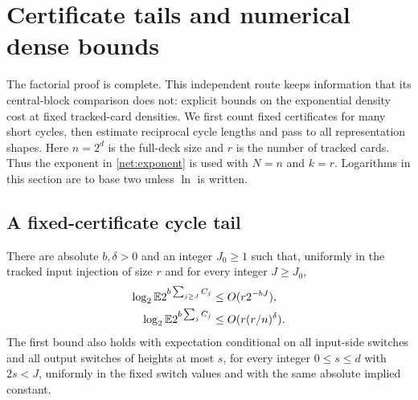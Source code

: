 \section{Certificate tails and numerical dense bounds}\label{sec:certificate}
The factorial proof is complete. This independent route keeps information that its central-block comparison does not: explicit bounds on the exponential density cost at fixed tracked-card densities. We first count fixed certificates for many short cycles, then estimate reciprocal cycle lengths and pass to all representation shapes. Here $n=2^d$ is the full-deck size and $r$ is the number of tracked cards. Thus the exponent in \eqref{net:exponent} is used with $N=n$ and $k=r$. Logarithms in this section are to base two unless $\ln$ is written.

\subsection{A fixed-certificate cycle tail}\label{net:certificate}
\begin{proposition}\label{net:hightail}
There are absolute $b,\delta>0$ and an integer $J_0\ge1$ such that, uniformly in the tracked input injection of size $r$ and for every integer $J\ge J_0$,
\begin{align}
 \log_2\mathbb E 2^{b\sum_{j\ge J}C_j}&\le O(r2^{-bJ}),\label{net:highmgf}\\
 \log_2\mathbb E 2^{b\sum_jC_j}&\le O(r(r/n)^\delta).\label{net:sparsemgf}
\end{align}
The first bound also holds with expectation conditional on all input-side
switches and all output switches of heights at most $s$, for every integer
$0\le s\le d$ with $2s<J$, uniformly in the fixed switch values and with
the same absolute implied constant.
\end{proposition}
